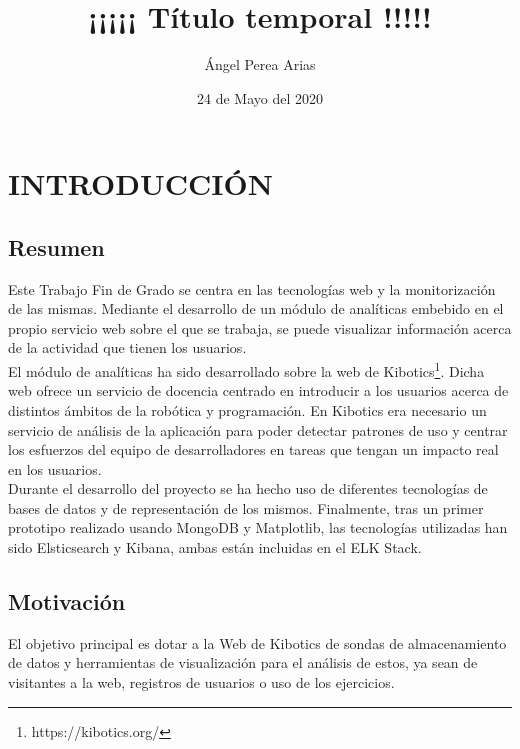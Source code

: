 \documentclass[11pt,a4paper]{book}
\author{Ángel Perea Arias}
\newcommand{\mychapter}[2]{
	\setcounter{chapter}{#1}
	\setcounter{section}{0}
	\chapter*{#2}
	\addcontentsline{toc}{chapter}{#2}
}
\begin{document}
	\title{¡¡¡¡¡ Título temporal !!!!!}
	\date{24 de Mayo del 2020}
	\maketitle
	
	
	\tableofcontents
	\listoffigures
	
	\chapter{INTRODUCCIÓN}
		\section{Resumen}
			Este Trabajo Fin de Grado se centra en las tecnologías web y la monitorización de las mismas. Mediante el desarrollo de un módulo de analíticas embebido en el propio servicio web sobre el que se trabaja, se puede visualizar información acerca de la actividad que tienen los usuarios.\\
						
			El módulo de analíticas ha sido desarrollado sobre la web de Kibotics\footnote{https://kibotics.org/}. Dicha web ofrece un servicio de docencia centrado en introducir a los usuarios acerca de distintos ámbitos de la robótica y programación. En Kibotics era necesario un servicio de análisis de la aplicación para poder detectar patrones de uso y centrar los esfuerzos del equipo de desarrolladores en tareas que tengan un impacto real en los usuarios.\\
			
			Durante el desarrollo del proyecto se ha hecho uso de diferentes tecnologías de bases de datos y de representación de los mismos. Finalmente, tras un primer prototipo realizado usando MongoDB y Matplotlib, las tecnologías utilizadas han sido Elsticsearch y Kibana, ambas están incluidas en el ELK Stack.
		\section{Motivación}
			El objetivo principal es dotar a la Web de Kibotics de sondas de almacenamiento de datos y herramientas de visualización para el análisis de estos, ya sean de visitantes a la web, registros de usuarios o uso de los ejercicios.\\
			
\end{document}
